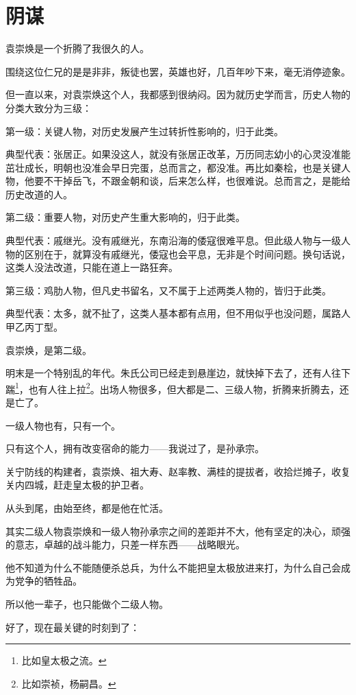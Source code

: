 \section{阴谋}
\ifnum{}
	\begin{multicols}{\theparacolNo}
\fi
袁崇焕是一个折腾了我很久的人。

围绕这位仁兄的是是非非，叛徒也罢，英雄也好，几百年吵下来，毫无消停迹象。

但一直以来，对袁崇焕这个人，我都感到很纳闷。因为就历史学而言，历史人物的分类大致分为三级：

第一级：关键人物，对历史发展产生过转折性影响的，归于此类。

典型代表：张居正。如果没这人，就没有张居正改革，万历同志幼小的心灵没准能茁壮成长，明朝也没准会早日完蛋，总而言之，都没准。再比如秦桧，也是关键人物，他要不干掉岳飞，不跟金朝和谈，后来怎么样，也很难说。总而言之，是能给历史改道的人。

第二级：重要人物，对历史产生重大影响的，归于此类。

典型代表：戚继光。没有戚继光，东南沿海的倭寇很难平息。但此级人物与一级人物的区别在于，就算没有戚继光，倭寇也会平息，无非是个时间问题。换句话说，这类人没法改道，只能在道上一路狂奔。

第三级：鸡肋人物，但凡史书留名，又不属于上述两类人物的，皆归于此类。

典型代表：太多，就不扯了，这类人基本都有点用，但不用似乎也没问题，属路人甲乙丙丁型。

袁崇焕，是第二级。

明末是一个特别乱的年代。朱氏公司已经走到悬崖边，就快掉下去了，还有人往下踹\footnote{比如皇太极之流。}，也有人往上拉\footnote{比如崇祯，杨嗣昌。}。出场人物很多，但大都是二、三级人物，折腾来折腾去，还是亡了。

一级人物也有，只有一个。

只有这个人，拥有改变宿命的能力——我说过了，是孙承宗。

关宁防线的构建者，袁崇焕、祖大寿、赵率教、满桂的提拔者，收拾烂摊子，收复关内四城，赶走皇太极的护卫者。

从头到尾，由始至终，都是他在忙活。

其实二级人物袁崇焕和一级人物孙承宗之间的差距并不大，他有坚定的决心，顽强的意志，卓越的战斗能力，只差一样东西——战略眼光。

他不知道为什么不能随便杀总兵，为什么不能把皇太极放进来打，为什么自己会成为党争的牺牲品。

所以他一辈子，也只能做个二级人物。

好了，现在最关键的时刻到了：


\end{multicols}
